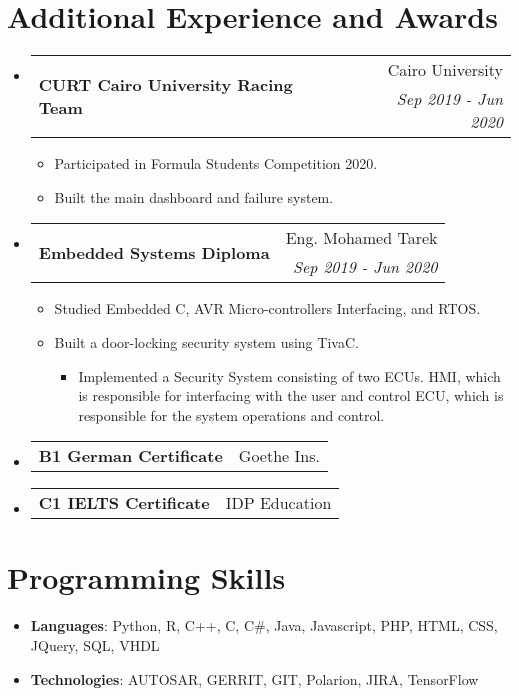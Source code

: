 \documentclass[letterpaper,11pt]{article}
\makeatletter
\newcommand{\CvSubheadingWithoutTitle}[3]{
  \vspace{-1pt}\item
    \begin{tabular*}{0.97\textwidth}{l@{\extracolsep{\fill}}r}
    \multirow{2}{*}{\textbf{#1}} & #2 \\
     & \textit{\small #3} \\
    \end{tabular*}\vspace{-5pt}
}
\newcommand{\CvSubSubheadingWithoutTitleAndDate}[2]{
  \vspace{-1pt}\item
    \begin{tabular*}{0.97\textwidth}{l@{\extracolsep{\fill}}r}
    {\textbf{#1}} & #2 \\
    \end{tabular*}\vspace{-10pt}
}
\newcommand{\CvSubHeadingListStart}{\begin{itemize}[leftmargin=*,topsep = 0pt]}
\newcommand{\CvSubHeadingListEnd}{\end{itemize}}
\makeatother
\begin{document}
%
%
\section{Additional Experience and Awards}
    \CvSubHeadingListStart
        \CvSubheadingWithoutTitle
        {CURT Cairo University Racing Team}{Cairo University}
        {Sep 2019 - Jun 2020 }
            {\begin{itemize}[topsep = -5pt, itemsep = -2pt]
                \item Participated in Formula Students Competition 2020.
                \item Built the main dashboard and failure system.
            \end{itemize}}
    \CvSubheadingWithoutTitle
        {Embedded Systems Diploma}{Eng. Mohamed Tarek}
        {Sep 2019 - Jun 2020 }
            \begin{itemize}[topsep = -5pt, itemsep = -2pt]
                \item Studied Embedded C, AVR Micro-controllers Interfacing, and RTOS.
                \item Built a door-locking security system using TivaC.
                \begin{itemize}[topsep = -1pt]
                    \item Implemented a Security System consisting of two ECUs. HMI, which is responsible for interfacing with 
                    the user and control ECU, which is responsible for the system operations and control.
                \end{itemize} 
            \end{itemize}
    \CvSubSubheadingWithoutTitleAndDate
    {B1 German Certificate} {Goethe Ins.}
    \CvSubSubheadingWithoutTitleAndDate
    {C1 IELTS Certificate} { IDP Education}
    \CvSubHeadingListEnd
%
\section{Programming Skills}
 \CvSubHeadingListStart
   \item{
     \textbf{Languages}{: Python, R, C++, C, C\#, Java, Javascript, PHP, HTML, CSS, JQuery, SQL, VHDL}}
   \item{
    \textbf{Technologies}{: AUTOSAR, GERRIT, GIT, Polarion, JIRA, TensorFlow}
   }  
 \CvSubHeadingListEnd


\end{document}

